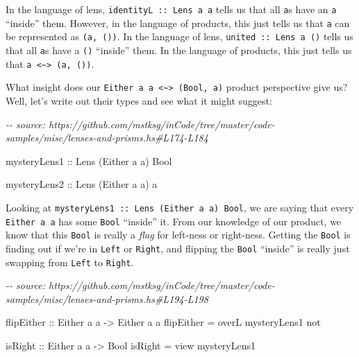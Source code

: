 \documentclass[]{article}
\newenvironment{Shaded}{}{}
\newcommand{\CommentTok}[1]{\textcolor[rgb]{0.38,0.63,0.69}{\textit{#1}}}
\newcommand{\DataTypeTok}[1]{\textcolor[rgb]{0.56,0.13,0.00}{#1}}
\newcommand{\FunctionTok}[1]{\textcolor[rgb]{0.02,0.16,0.49}{#1}}
\newcommand{\NormalTok}[1]{#1}
\newcommand{\OtherTok}[1]{\textcolor[rgb]{0.00,0.44,0.13}{#1}}
\begin{document}
In the language of lens, \texttt{identityL\ ::\ Lens\textquotesingle{}\ a\ a}
tells us that all \texttt{a}s have an \texttt{a} ``inside'' them. However, in
the language of products, this just tells us that \texttt{a} can be represented
as \texttt{(a,\ ())}. In the language of lens,
\texttt{united\ ::\ Lens\textquotesingle{}\ a\ ()} tells us that all \texttt{a}s
have a \texttt{()} ``inside'' them. In the language of products, this just tells
us that \texttt{a\ \textless{}\textasciitilde{}\textgreater{}\ (a,\ ())}.

What insight does our
\texttt{Either\ a\ a\ \textless{}\textasciitilde{}\textgreater{}\ (Bool,\ a)}
product perspective give us? Well, let's write out their types and see what it
might suggest:

\begin{Shaded}
\begin{Highlighting}[]
\CommentTok{{-}{-} source: https://github.com/mstksg/inCode/tree/master/code{-}samples/misc/lenses{-}and{-}prisms.hs\#L174{-}L184}

\OtherTok{mysteryLens1 ::} \DataTypeTok{Lens\textquotesingle{}}\NormalTok{ (}\DataTypeTok{Either}\NormalTok{ a a) }\DataTypeTok{Bool}

\OtherTok{mysteryLens2 ::} \DataTypeTok{Lens\textquotesingle{}}\NormalTok{ (}\DataTypeTok{Either}\NormalTok{ a a) a}
\end{Highlighting}
\end{Shaded}

Looking at
\texttt{mysteryLens1\ ::\ Lens\textquotesingle{}\ (Either\ a\ a)\ Bool}, we are
saying that every \texttt{Either\ a\ a} has some \texttt{Bool} ``inside'' it.
From our knowledge of our product, we know that this \texttt{Bool} is really a
\emph{flag} for left-ness or right-ness. Getting the \texttt{Bool} is finding
out if we're in \texttt{Left} or \texttt{Right}, and flipping the \texttt{Bool}
``inside'' is really just swapping from \texttt{Left} to \texttt{Right}.

\begin{Shaded}
\begin{Highlighting}[]
\CommentTok{{-}{-} source: https://github.com/mstksg/inCode/tree/master/code{-}samples/misc/lenses{-}and{-}prisms.hs\#L194{-}L198}

\OtherTok{flipEither ::} \DataTypeTok{Either}\NormalTok{ a a }\OtherTok{{-}\textgreater{}} \DataTypeTok{Either}\NormalTok{ a a}
\NormalTok{flipEither }\OtherTok{=}\NormalTok{ overL mysteryLens1 }\FunctionTok{not}

\OtherTok{isRight ::} \DataTypeTok{Either}\NormalTok{ a a }\OtherTok{{-}\textgreater{}} \DataTypeTok{Bool}
\NormalTok{isRight }\OtherTok{=}\NormalTok{ view mysteryLens1}
\end{Highlighting}
\end{Shaded}
\end{document}
